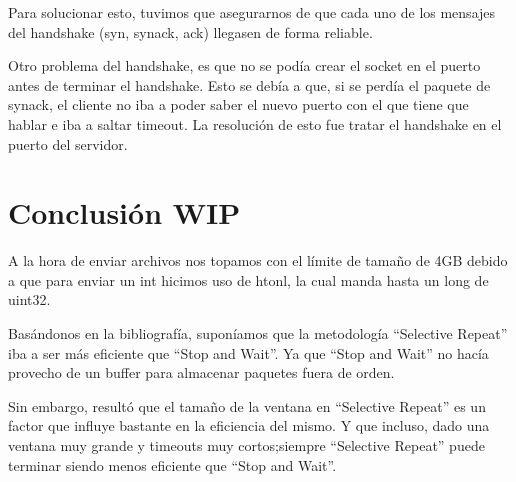 \documentclass{article}
\begin{document}
Para solucionar esto, tuvimos que asegurarnos de que cada uno de los
mensajes del handshake (syn, synack, ack) llegasen de forma reliable.

Otro problema del handshake, es que no se podía crear el socket en el
puerto antes de terminar el handshake. Esto se debía a que, si se perdía
el paquete de synack, el cliente no iba a poder saber el nuevo puerto
con el que tiene que hablar e iba a saltar timeout. La resolución de
esto fue tratar el handshake en el puerto del servidor.

\section{\texorpdfstring{\textbf{Conclusión
WIP}}{Conclusión}}\label{conclusiuxf3n-wip}

A la hora de enviar archivos nos topamos con el límite de tamaño de 4GB debido a que para enviar un int hicimos uso de htonl, la cual manda hasta un long de uint32.



Basándonos en la bibliografía, suponíamos que la metodología ``Selective Repeat'' iba a ser más eficiente que ``Stop and Wait''. Ya que ``Stop and Wait'' no hacía provecho de un buffer para almacenar paquetes fuera de orden.

Sin embargo, resultó que el tamaño de la ventana en ``Selective Repeat'' es un factor que influye bastante en la eficiencia del mismo. Y que incluso, dado una ventana muy grande y timeouts muy cortos;siempre ``Selective Repeat'' puede terminar siendo menos eficiente que ``Stop and Wait''.
\end{document}
